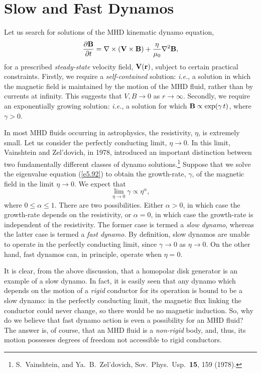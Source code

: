 \section{Slow  and Fast Dynamos}
Let us search for solutions of the MHD kinematic dynamo equation,
\begin{equation}\label{e5.92}
\frac{\partial {\bf B}}{\partial t} = \nabla\times({\bf V}\times{\bf B})
+ \frac{\eta}{\mu_0}\nabla^2{\bf B},
\end{equation}
for a prescribed {\em steady-state} velocity field, ${\bf V}({\bf r})$, 
subject to certain practical constraints. Firstly, we require a
{\em self-contained} solution: {\em i.e.}, a solution in which the
magnetic field is maintained by the motion of the MHD fluid, rather than 
by currents at infinity. This suggests that $V, B\rightarrow 0$ as $r\rightarrow
\infty$. Secondly, we require an exponentially growing solution:
{\em i.e.}, a solution for which ${\bf B}\propto \exp(\gamma\,t)$, where
$\gamma>0$. 

In most  MHD fluids occurring in astrophysics, the resistivity, $\eta$, is extremely
small. Let us consider the perfectly conducting limit, $\eta\rightarrow 0$. 
In this limit, Vainshtein and Zel'dovich, in 1978, introduced an important 
distinction
between two fundamentally different classes of dynamo 
solutions.\footnote{S.~Vainshtein, and Ya.~B.~Zel'dovich, Sov.\ Phys.\
 Usp.\ {\bf 15}, 159 (1978).}
Suppose that we solve the eigenvalue equation (\ref{e5.92}) to obtain the
growth-rate, $\gamma$, of the magnetic field in the limit $\eta\rightarrow 0$.
We expect that
\begin{equation}
\lim_{\eta\rightarrow 0}\gamma \propto \eta^\alpha,
\end{equation}
where $0\leq \alpha\leq 1$. There are two possibilities. Either $\alpha>0$,
in which case the growth-rate depends on the resistivity, or $\alpha=0$,
in which case the growth-rate is independent of the resistivity. The
former case is termed a {\em slow dynamo}, whereas the latter case is termed
a {\em fast dynamo}. By definition, slow dynamos are unable to operate
in the perfectly conducting limit, since $\gamma\rightarrow 0$ as 
$\eta\rightarrow 0$.
On the other hand, fast dynamos can, in principle, operate when $\eta=0$. 

It is clear, from the above discussion, that a homopolar disk generator is
an example of a slow dynamo. In fact, it is easily seen that any
dynamo which depends on the motion of a {\em rigid} conductor for its
operation is bound to be a slow dynamo: in the perfectly conducting
limit, the magnetic flux linking the conductor could never change, so there
would be no magnetic induction. So, why do we believe that fast dynamo
action is even a possibility for an MHD fluid? The answer is, of course, that
an MHD fluid is a {\em non-rigid} body, and, thus, its motion possesses
degrees of freedom not accessible to rigid conductors. 

